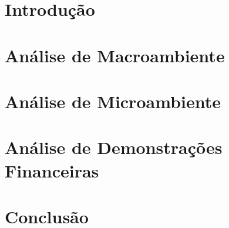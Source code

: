 \documentclass[
	12pt,				%
	openany,			%
  oneside,      %
	a4paper,			%
	english,			%
	french,				%
	spanish,			%
	brazil				%
	]{abntex2}
\begin{document}
\graphicspath{{./Gen/Image/}{../Gen/Image/}{./Image/}}

\chapter[Introdução]{Introdução}


\chapter[Análise de Macroambiente]{Análise de Macroambiente}


\chapter[Análise de Microambiente]{Análise de Microambiente}


\chapter[Análise de Demonstrações Financeiras]{Análise de Demonstrações Financeiras}


\chapter[Conclusão]{Conclusão}




%

\postextual

%
\end{document}
